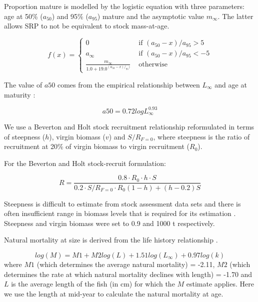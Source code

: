 \documentclass{pnastwo}
\begin{document}
\begin{article}
\begin{materials}
Proportion mature is modelled by the logistic equation with three parameters: age at 50\% ($a_{50}$) 
and 95\% ($a_{95}$) mature and the asymptotic value $m_{\infty}$. The latter allows SRP to not be equivalent 
to stock mass-at-age.

\begin{equation}
f(x) = \left\{ \begin{array}{ll}
			0                                 &\mbox{ if $(a_{50}-x)/a_{95} >  5$} \\
			a_{\infty}                        &\mbox{ if $(a_{50}-x)/a_{95} < -5$} \\
			\frac{m_{\infty}}{1.0+19.0^{(a_{50}-x)/_{95})}} &\mbox{ otherwise}
		\end{array}
       \right.
\end{equation}


The value of $a50$ comes from the empirical relationship between $L_{\infty}$ and age at maturity \cite{gislason2008coexistence}:

\begin{equation}
  a50=0.72 logL_{\infty}^{0.93}
\end{equation}

We use a Beverton and Holt stock recruitment relationship reformulated in terms of steepness ($h$), virgin biomass ($v$) and $S/R_{F=0}$, 
where steepness is the ratio of recruitment at 20\% of virgin biomass to virgin recruitment ($R_0$). 

For the Beverton and Holt stock-recruit formulation:

\begin{equation}
R=\frac{0.8 \cdot R_0 \cdot h \cdot S}{0.2 \cdot S/R_{F=0} \cdot R_0(1-h)+(h-0.2)S}
\end{equation} 

Steepness is difficult to estimate from stock assessment data sets and there is 
often insufficient range in biomass levels that is required for its estimation 
\cite{ISSF2011steep}. Steepness and virgin biomass were set to 0.9 and 1000 t 
respectively.

Natural mortality at size is derived from the life history relationship \cite{gislason2010does}.
               
\begin{equation}
           log(M) = M1 + M2 log(L) + 1.51log(L_{\infty}) + 0.97log(k) 
\end{equation} 
where $M1$ (which determines the average natural mortality) = -2.11, $M2$ (which determines 
the rate at which natural mortality declines with length) = -1.70 and $L$ is 
the average length of the fish (in cm) for which the $M$ estimate applies. Here
we use the length at mid-year to calculate the natural mortality at age.



\end{materials}
\end{article}
\end{document}
